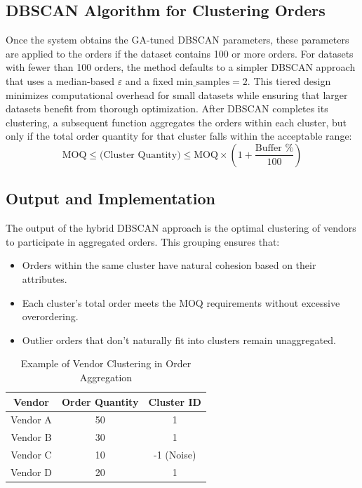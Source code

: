 \subsection{DBSCAN Algorithm for Clustering Orders}

Once the system obtains the GA-tuned DBSCAN parameters, these parameters are applied to the orders if the dataset contains 100 or more orders. For datasets with fewer than 100 orders, the method defaults to a simpler DBSCAN approach that uses a median-based $\varepsilon$ and a fixed $\text{min\_samples} = 2$. This tiered design minimizes computational overhead for small datasets while ensuring that larger datasets benefit from thorough optimization. After DBSCAN completes its clustering, a subsequent function aggregates the orders within each cluster, but only if the total order quantity for that cluster falls within the acceptable range:
\begin{equation}
    \text{MOQ} \leq \text{(Cluster Quantity)} \leq \text{MOQ} \times \left(1 + \frac{\text{Buffer \%}}{100}\right)
    \label{eq:moq}
\end{equation}

\subsection{Output and Implementation}

The output of the hybrid DBSCAN approach is the optimal clustering of vendors to participate in aggregated orders. This grouping ensures that:

\begin{itemize}
    \item Orders within the same cluster have natural cohesion based on their attributes.
    \item Each cluster's total order meets the MOQ requirements without excessive overordering.
    \item Outlier orders that don't naturally fit into clusters remain unaggregated.
\end{itemize}

\begin{table}[h!]
    \centering
    \begin{tabular}{|c|c|c|}
        \hline
        \textbf{Vendor} & \textbf{Order Quantity} & \textbf{Cluster ID} \\
        \hline
        Vendor A        & 50                      & 1                   \\
        Vendor B        & 30                      & 1                   \\
        Vendor C        & 10                      & -1 (Noise)          \\
        Vendor D        & 20                      & 1                   \\
        \hline
    \end{tabular}
    \caption{Example of Vendor Clustering in Order Aggregation}
\end{table}

